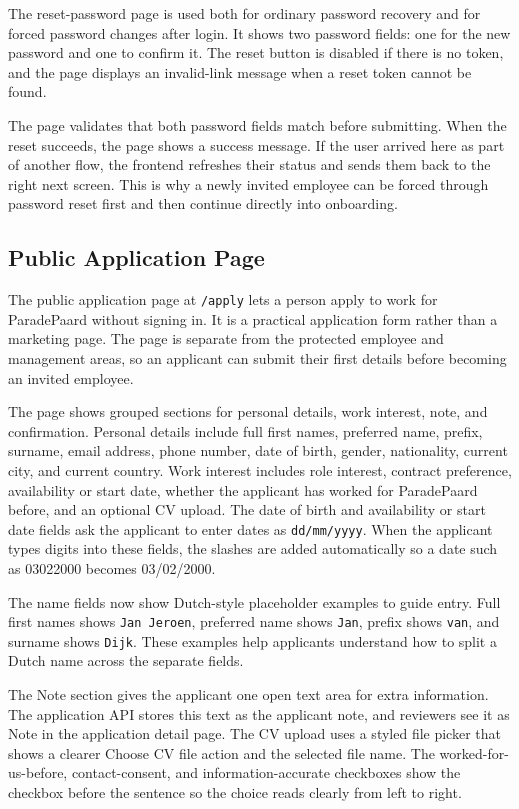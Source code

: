 \documentclass[11pt]{article}
\newcommand{\code}[1]{\nolinkurl{#1}}
\begin{document}
The reset-password page is used both for ordinary password recovery and for forced password changes after login. It shows two password fields: one for the new password and one to confirm it. The reset button is disabled if there is no token, and the page displays an invalid-link message when a reset token cannot be found.

The page validates that both password fields match before submitting. When the reset succeeds, the page shows a success message. If the user arrived here as part of another flow, the frontend refreshes their status and sends them back to the right next screen. This is why a newly invited employee can be forced through password reset first and then continue directly into onboarding.

\subsection{Public Application Page}

The public application page at \code{/apply} lets a person apply to work for ParadePaard without signing in. It is a practical application form rather than a marketing page. The page is separate from the protected employee and management areas, so an applicant can submit their first details before becoming an invited employee.

The page shows grouped sections for personal details, work interest, note, and confirmation. Personal details include full first names, preferred name, prefix, surname, email address, phone number, date of birth, gender, nationality, current city, and current country. Work interest includes role interest, contract preference, availability or start date, whether the applicant has worked for ParadePaard before, and an optional CV upload. The date of birth and availability or start date fields ask the applicant to enter dates as \code{dd/mm/yyyy}. When the applicant types digits into these fields, the slashes are added automatically so a date such as 03022000 becomes 03/02/2000.

The name fields now show Dutch-style placeholder examples to guide entry. Full first names shows \code{Jan Jeroen}, preferred name shows \code{Jan}, prefix shows \code{van}, and surname shows \code{Dijk}. These examples help applicants understand how to split a Dutch name across the separate fields.

The Note section gives the applicant one open text area for extra information. The application API stores this text as the applicant note, and reviewers see it as Note in the application detail page. The CV upload uses a styled file picker that shows a clearer Choose CV file action and the selected file name. The worked-for-us-before, contact-consent, and information-accurate checkboxes show the checkbox before the sentence so the choice reads clearly from left to right.
\end{document}
